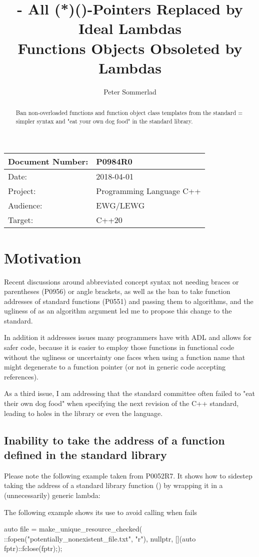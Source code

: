 \documentclass[ebook,11pt,article]{memoir}
\title{\papernumber{} - All (*)()-Pointers Replaced by Ideal Lambdas\\
Functions Objects Obsoleted by Lambdas}
\author{Peter Sommerlad}
\date{\paperdate}                        %
\newcommand{\papernumber}{P0984R0}
\newcommand{\paperdate}{2018-04-01}
\begin{document}
\maketitle
\begin{tabular}[t]{|l|l|}\hline 
Document Number:& \papernumber  \\\hline
Date: & \paperdate \\\hline
Project: & Programming Language C++\\\hline 
Audience: & EWG/LEWG\\\hline
Target: & C++20\\\hline
\end{tabular}

\begin{abstract}
Ban non-overloaded functions and  function object class templates from the standard = simpler syntax and "eat your own dog food" in the standard library.
\end{abstract}

\chapter{Motivation}


Recent discussions around abbreviated concept syntax not needing braces or parentheses (P0956) or angle brackets, as well as the ban to take function addresses of standard functions (P0551) and passing them to algorithms, and the ugliness of  as an algorithm argument led me to propose this change to the standard.

In addition it addresses issues many programmers have with ADL and allows for safer code, because it is easier to employ those functions in functional code without the ugliness or uncertainty one faces when using a function name that might degenerate to a function pointer (or not in generic code accepting references).

As a third issue, I am addressing that the standard committee often failed to "eat their own dog food" when specifying the next revision of the C++ standard, leading to holes in the library or even the language.


\section{Inability to take the address of a function defined in the standard library}
Please note the following example taken from P0052R7. It shows how to sidestep taking the address of a standard library function () by wrapping it in a (unnecessarily) generic lambda:
\begin{example}
The following example shows its use to avoid calling  when  fails
\begin{codeblock}
auto file = make_unique_resource_checked(
  ::fopen("potentially_nonexistent_file.txt", "r"), 
  nullptr, [](auto fptr){::fclose(fptr);});
\end{codeblock}
\end{example}
\end{document}
